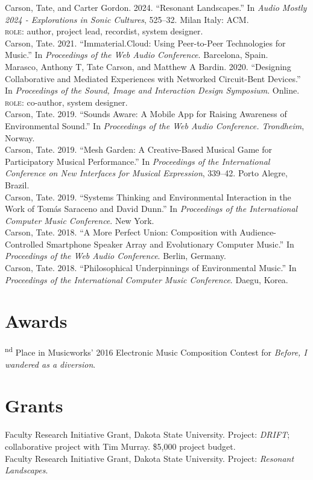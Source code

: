 \documentclass[12pt, a4paper]{article}
\newcommand{\years}[1]{\leavevmode\marginnote{\scriptsize #1}\ignorespaces}%
\newcommand{\role}[1]{{\small\textsc{role}: #1}}
\begin{document}
\years{2024} Carson, Tate, and Carter Gordon. 2024. “Resonant Landscapes.” In \textit{Audio Mostly 2024 - Explorations in Sonic Cultures}, 525–32. Milan Italy: ACM.\\
\role{author, project lead, recordist, system designer}.\\
\years{2021} Carson, Tate. 2021. “Immaterial.Cloud: Using Peer-to-Peer Technologies for Music.” In \textit{Proceedings of the Web Audio Conference}. Barcelona, Spain. \\ 
\years{2020} Marasco, Anthony T, Tate Carson, and Matthew A Bardin. 2020. “Designing Collaborative and Mediated Experiences with Networked Circuit-Bent Devices.” In \textit{Proceedings of the Sound, Image and Interaction Design Symposium}. Online.\\
\role{co-author, system designer}.\\
\years{2019} Carson, Tate. 2019. “Sounds Aware: A Mobile App for Raising Awareness of Environmental Sound.” In \textit{Proceedings of the Web Audio Conference. Trondheim}, Norway.\\
Carson, Tate. 2019. “Mesh Garden: A Creative-Based Musical Game for Participatory Musical Performance.” In \textit{Proceedings of the International Conference on New Interfaces for Musical Expression}, 339–42. Porto Alegre, Brazil.\\
Carson, Tate. 2019. “Systems Thinking and Environmental Interaction in the Work of Tomás Saraceno and David Dunn.” In \textit{Proceedings of the International Computer Music Conference}. New York.
\\
\years{2018} Carson, Tate. 2018. “A More Perfect Union: Composition with Audience-Controlled Smartphone Speaker Array and Evolutionary Computer Music.” In \textit{Proceedings of the Web Audio Conference}. Berlin, Germany.\\
Carson, Tate. 2018. “Philosophical Underpinnings of Environmental Music.” In \textit{Proceedings of the International Computer Music Conference}. Daegu, Korea.

\section*{Awards}
\years{2016} 2\textsuperscript{nd} Place in Musicworks’ 2016 Electronic Music Composition Contest for \textit{Before, I wandered as a diversion}. 

\section*{Grants}
\years{2025--26} Faculty Research Initiative Grant, Dakota State University. Project: \textit{DRIFT}; collaborative project with Tim Murray. \$5,000 project budget. \\
\years{2023--24} Faculty Research Initiative Grant, Dakota State University. Project: \textit{Resonant Landscapes}.
\end{document}
